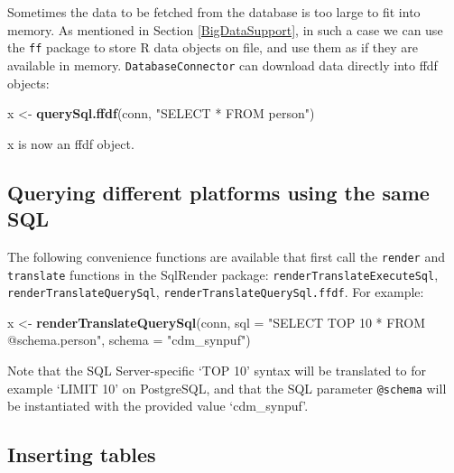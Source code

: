 \documentclass[11pt]{book}
\newenvironment{Shaded}{\begin{snugshade}}{\end{snugshade}}
\newcommand{\DataTypeTok}[1]{\textcolor[rgb]{0.13,0.29,0.53}{#1}}
\newcommand{\KeywordTok}[1]{\textcolor[rgb]{0.13,0.29,0.53}{\textbf{#1}}}
\newcommand{\NormalTok}[1]{#1}
\newcommand{\StringTok}[1]{\textcolor[rgb]{0.31,0.60,0.02}{#1}}
\theoremstyle{definition}
\theoremstyle{definition}
\theoremstyle{definition}
\theoremstyle{remark}
\begin{document}
Sometimes the data to be fetched from the database is too large to fit into memory. As mentioned in Section \ref{BigDataSupport}, in such a case we can use the \texttt{ff} package to store R data objects on file, and use them as if they are available in memory. \texttt{DatabaseConnector} can download data directly into ffdf objects:

\begin{Shaded}
\begin{Highlighting}[]
\NormalTok{x <-}\StringTok{ }\KeywordTok{querySql.ffdf}\NormalTok{(conn, }\StringTok{"SELECT * FROM person"}\NormalTok{)}
\end{Highlighting}
\end{Shaded}

x is now an ffdf object.

\hypertarget{querying-different-platforms-using-the-same-sql}{%
\subsection{Querying different platforms using the same SQL}\label{querying-different-platforms-using-the-same-sql}}

The following convenience functions are available that first call the \texttt{render} and \texttt{translate} functions in the SqlRender package: \texttt{renderTranslateExecuteSql}, \texttt{renderTranslateQuerySql}, \texttt{renderTranslateQuerySql.ffdf}. For example:

\begin{Shaded}
\begin{Highlighting}[]
\NormalTok{x <-}\StringTok{ }\KeywordTok{renderTranslateQuerySql}\NormalTok{(conn, }
                             \DataTypeTok{sql =} \StringTok{"SELECT TOP 10 * FROM @schema.person"}\NormalTok{,}
                             \DataTypeTok{schema =} \StringTok{"cdm_synpuf"}\NormalTok{)}
\end{Highlighting}
\end{Shaded}

Note that the SQL Server-specific `TOP 10' syntax will be translated to for example `LIMIT 10' on PostgreSQL, and that the SQL parameter \texttt{@schema} will be instantiated with the provided value `cdm\_synpuf'.

\hypertarget{inserting-tables}{%
\subsection{Inserting tables}\label{inserting-tables}}
\end{document}
